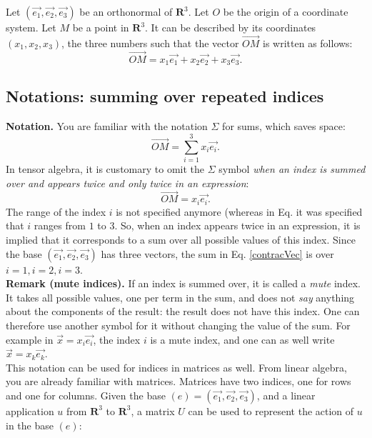 \documentclass[DIV=12]{article}
\begin{document}
Let $(\vec{e_1}, \vec{e_2}, \vec{e_3})$ be an orthonormal 
 of $\mathbf{R}^3$.
 Let $O$ be the origin of a coordinate system. Let $M$ be a point in $\mathbf{R}^3$.
 It can be described by its coordinates $(x_1,x_2,x_3)$, the three numbers 
such that the vector $\vec{OM}$ is written as follows:
\begin{equation}
\overrightarrow{OM} = x_1\vec{e_1}+ x_2\vec{e_2}+x_3\vec{e_3}.
\end{equation}

\subsection{Notations: summing over repeated indices}

{\bf{Notation.}} You are familiar with the notation $\Sigma$ for sums, which saves space:
\begin{equation}
\overrightarrow{OM} = \sum_{i=1}^3 x_i\vec{e_i}.
\label{sumVec}
\end{equation}
In tensor algebra, it is customary to omit the $\Sigma$ symbol
 {\emph{when an index is summed over and appears twice and only twice in an expression}}:
\begin{equation}
\overrightarrow{OM} =  x_i\vec{e_i}.
\label{contracVec}
\end{equation}
 The range of the index $i$ is not specified anymore (whereas
 in Eq. it was specified that $i$ ranges from $1$ to $3$. So, when
 an index appears twice in an expression, it is implied 
that it corresponds to a sum over all possible values of this index.
 Since the base $(\vec{e_1},\vec{e_2},\vec{e_3})$ has three vectors,
 the sum in Eq. \ref{contracVec} is over $i=1,i=2,i=3$.\\

 \vspace{3mm}
{\bf{Remark (mute indices).}} If an index is summed over, it is called a {\emph{mute}} index.
 It takes all possible values, one per term in the sum, and does not {\emph{say}} 
 anything about the components of the result: the result does not have this index. One can therefore 
 use another symbol for it without changing the value of the 
sum. For example in $\vec{x} = x_i \vec{e_i}$, the index $i$ is a mute index,
and one can as well write $\vec{x} = x_k \vec{e_k}$.\\ 

This notation can be used for indices in matrices as well.
From linear algebra, you are already familiar with matrices.
 Matrices have two indices, one for rows and one for columns.
 Given the base $(e)=(\vec{e_1},\vec{e_2},\vec{e_3})$, and 
 a linear application $u$ from $\mathbf{R}^3$ to $\mathbf{R}^3$,
 a matrix $U$ can be used to represent the 
 action of $u$ in the base $(e)$:\\
\end{document}
